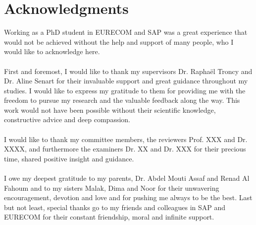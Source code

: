 \chapter*{Acknowledgments}

Working as a PhD student in EURECOM and SAP was a great experience that would not be achieved without the help and support of many people, who I would like to acknowledge here.
\\
\\
First and foremost, I would like to thank my supervisors Dr. Rapha\"el Troncy and Dr. Aline Senart for their invaluable support and great guidance throughout my studies. I would like to express my gratitude to them for providing me with the freedom to pursue my research and the valuable feedback along the way. This work would not have been possible without their scientific knowledge, constructive advice and deep compassion.
\\
\\
I would like to thank my committee members, the reviewers Prof. XXX  and Dr. XXXX, and furthermore the examiners Dr. XX and Dr. XXX for their precious time, shared positive insight and guidance.
\\
\\
I owe my deepest gratitude to my parents, Dr. Abdel Mouti Assaf and Renad Al Fahoum and to my sisters Malak, Dima and Noor for their unwavering encouragement, devotion and love and for pushing me always to be the best.  Last but not least, special thanks go to my friends and colleagues in SAP and EURECOM for their constant friendship, moral and infinite support.
